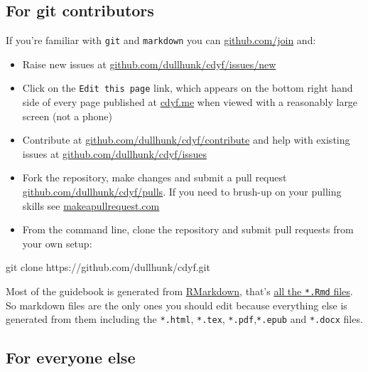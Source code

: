 \documentclass[
]{book}
\newenvironment{Shaded}{\begin{snugshade}}{\end{snugshade}}
\newcommand{\NormalTok}[1]{#1}
\providecommand{\tightlist}{%
  \setlength{\itemsep}{0pt}\setlength{\parskip}{0pt}}
\begin{document}
\hypertarget{techies}{%
\subsection{For git contributors}\label{techies}}

If you're familiar with \texttt{git} and \texttt{markdown} you can \href{https://github.com/join}{github.com/join} and:

\begin{itemize}
\tightlist
\item
  Raise new issues at \href{https://github.com/dullhunk/cdyf/issues/new}{github.com/dullhunk/cdyf/issues/new}
\item
  Click on the \texttt{Edit\ this\ page} link, which appears on the bottom right hand side of every page published at \href{https://www.cdyf.me}{cdyf.me} when viewed with a reasonably large screen (not a phone)
\item
  Contribute at \href{https://github.com/dullhunk/cdyf/contribute}{github.com/dullhunk/cdyf/contribute} and help with existing issues at \href{https://github.com/dullhunk/cdyf/issues}{github.com/dullhunk/cdyf/issues}
\item
  Fork the repository, make changes and submit a pull request \href{https://github.com/dullhunk/cdyf/pulls}{github.com/dullhunk/cdyf/pulls}. If you need to brush-up on your pulling skills see \href{http://makeapullrequest.com/}{makeapullrequest.com}
\item
  From the command line, clone the repository and submit pull requests from your own setup:
\end{itemize}

\begin{Shaded}
\begin{Highlighting}[]
\NormalTok{git clone https://github.com/dullhunk/cdyf.git}
\end{Highlighting}
\end{Shaded}

Most of the guidebook is generated from \href{https://en.wikipedia.org/wiki/Markdown}{RMarkdown}, that's \href{https://github.com/dullhunk/cdyf/search?l=RMarkdown}{all the \texttt{*.Rmd} files}. So markdown files are the only ones you should edit because everything else is generated from them including the \texttt{*.html}, \texttt{*.tex}, \texttt{*.pdf},\texttt{*.epub} and \texttt{*.docx} files.

\hypertarget{elseif}{%
\subsection{For everyone else}\label{elseif}}
\end{document}
